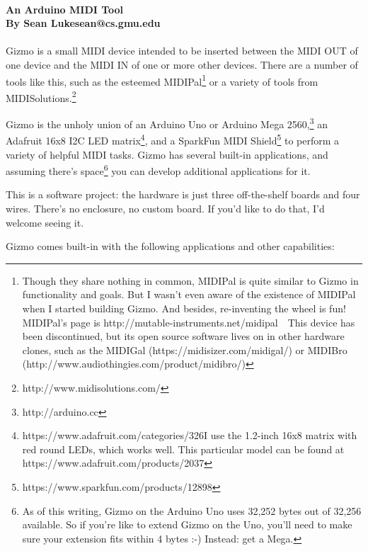 \documentclass{article}
\begin{document}
\\
{\large \bf An Arduino MIDI Tool\\
By Sean Luke\quad sean@cs.gmu.edu}\\
\\

\noindent Gizmo is a small MIDI device intended to be inserted between the MIDI OUT of one device and the MIDI IN of one or more other devices.  There are a number of tools like this, such as the esteemed MIDIPal\footnote{Though they share nothing in common, MIDIPal is quite similar to Gizmo in functionality and goals.  But I wasn't even aware of the existence of MIDIPal when I started building Gizmo.  And besides, re-inventing the wheel is fun!  MIDIPal's page is http:/\!/mutable-instruments.net/midipal\ \ This device has been discontinued, but its open source software lives on in other hardware clones, such as the MIDIGal (https:/\!/midisizer.com/midigal/) or MIDIBro (http:/\!/www.audiothingies.com/product/midibro/)} or a variety of tools from MIDISolutions.\footnote{http:/\!/www.midisolutions.com/}

Gizmo is the unholy union of an Arduino Uno or Arduino Mega 2560,\footnote{http:/\!/arduino.cc} an Adafruit 16x8 I2C LED matrix\footnote{https:/\!/www.adafruit.com/categories/326\quad I use the 1.2-inch 16x8 matrix with red round LEDs, which works well.  This particular model can be found at https:/\!/www.adafruit.com/products/2037}, and a SparkFun MIDI Shield\footnote{https:/\!/www.sparkfun.com/products/12898} to perform a variety of helpful MIDI tasks.  Gizmo has several built-in applications, and assuming there's space\footnote{As of this writing, Gizmo on the Arduino Uno uses 32,252 bytes out of 32,256 available.  So if you're like to extend Gizmo on the Uno, you'll need to make sure your extension fits within 4 bytes :-)  Instead: get a Mega.} you can develop additional applications for it.

This is a software project: the hardware is just three off-the-shelf boards and four wires.  There's no enclosure, no custom board.  If you'd like to do that, I'd welcome seeing it.

Gizmo comes built-in with the following applications and other capabilities:
\end{document}

